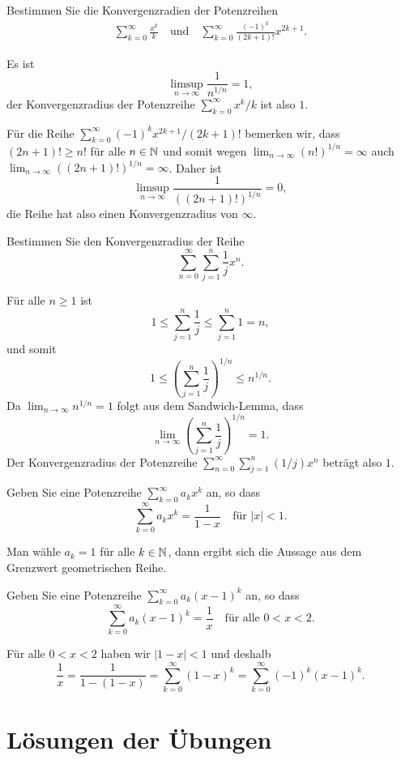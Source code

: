 \documentclass[a4paper,10pt]{article}
\begin{document}
\begin{question}
 Bestimmen Sie die Konvergenzradien der Potenzreihen
 \begin{align*}
  \sum_{k=0}^\infty \frac{x^k}{k}
  \quad
  \text{und}
  \quad
  \sum_{k=0}^\infty \frac{(-1)^k}{(2k+1)!} x^{2k+1}.
 \end{align*}
\end{question}
\begin{solution}
 Es ist
 \[
  \limsup_{n \to \infty} \frac{1}{n^{1/n}} = 1,
 \]
 der Konvergenzradius der Potenzreihe $\sum_{k=0}^\infty x^k/k$ ist also $1$.
 
 Für die Reihe $\sum_{k=0}^\infty (-1)^k x^{2k+1}/(2k+1)!$ bemerken wir, dass $(2n+1)! \geq n!$ für alle $n \in \mathbb{N}$ und somit wegen $\lim_{n \to \infty} (n!)^{1/n} = \infty$ auch $\lim_{n \to \infty} ((2n+1)!)^{1/n} = \infty$. Daher ist
 \[
  \limsup_{n \to \infty} \frac{1}{((2n+1)!)^{1/n}}
  = 0,
 \]
 die Reihe hat also einen Konvergenzradius von $\infty$.
\end{solution}


\begin{question}
 Bestimmen Sie den Konvergenzradius der Reihe
 \[
  \sum_{n=0}^\infty \sum_{j=1}^n \frac{1}{j} x^n.
 \]
\end{question}
\begin{solution}
 Für alle $n \geq 1$ ist
 \[
  1 \leq \sum_{j=1}^n \frac{1}{j} \leq \sum_{j=1}^n 1 = n,
 \]
 und somit
 \[
  1 \leq \left( \sum_{j=1}^n \frac{1}{j} \right)^{1/n} \leq n^{1/n}.
 \]
 Da $\lim_{n \to \infty} n^{1/n} = 1$ folgt aus dem Sandwich-Lemma, dass
 \[
  \lim_{n \to \infty} \left( \sum_{j=1}^n \frac{1}{j} \right)^{1/n} = 1.
 \]
 Der Konvergenzradius der Potenzreihe $\sum_{n=0}^\infty \sum_{j=1}^n (1/j) x^n$ beträgt also $1$.
\end{solution}


\begin{question}
Geben Sie eine Potenzreihe $\sum_{k=0}^\infty a_k x^k$ an, so dass
\[
 \sum_{k=0}^\infty a_k x^k = \frac{1}{1-x} \quad \text{für $|x| < 1$}.
\]
\end{question}
\begin{solution}
 Man wähle $a_k = 1$ für alle $k \in \mathbb{N}$, dann ergibt sich die Aussage aus dem Grenzwert geometrischen Reihe.
\end{solution}


\begin{question}
 Geben Sie eine Potenzreihe $\sum_{k=0}^\infty a_k (x-1)^k$ an, so dass
 \[
  \sum_{k=0}^\infty a_k (x-1)^k = \frac{1}{x} \quad \text{für alle $0 < x < 2$}.
 \]
\end{question}
\begin{solution}
 Für alle $0 < x < 2$ haben wir $|1-x| < 1$ und deshalb
 \[
  \frac{1}{x}
  = \frac{1}{1-(1-x)}
  = \sum_{k=0}^\infty (1-x)^k
  = \sum_{k=0}^\infty (-1)^k (x-1)^k.
 \]
\end{solution}















\newpage





\section{Lösungen der Übungen}

\printsolutions
\end{document}
